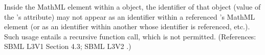 Inside the  MathML element within a \FunctionDefinition object, the identifier of that object (\ie value of the \FunctionDefinition's  attribute) may not appear as an identifier within a referenced \FunctionDefinition's  MathML element (or as an identifier within another \FunctionDefinition whose identifier is referenced, etc.).  Such usage entails a recursive function call, which is not permitted.  (References: SBML L3V1 Section 4.3; SBML L3V2 .)
